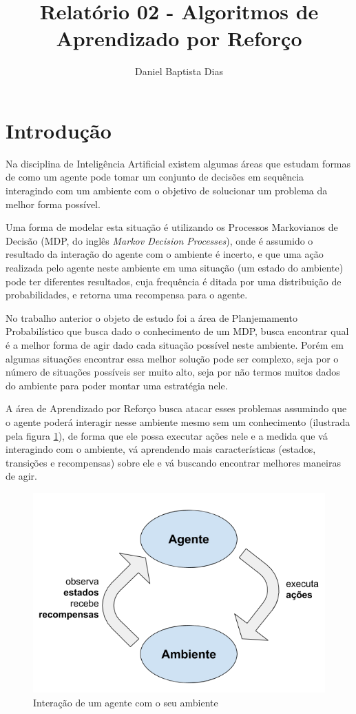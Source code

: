 \documentclass[letterpaper]{article}
\title{Relatório 02 - Algoritmos de Aprendizado por Reforço}
\author{Daniel Baptista Dias}
\begin{document}
\maketitle

\section{Introdução}
\label{sec:introducao}

Na disciplina de Inteligência Artificial existem algumas áreas que estudam formas de como um agente pode tomar um conjunto 
de decisões em sequência interagindo com um ambiente com o objetivo de solucionar um problema da melhor forma possível.

Uma forma de modelar esta situação é utilizando os Processos Markovianos de Decisão (MDP, do inglês \textit{Markov Decision Processes})\cite{Puterman-1994}, onde é assumido o resultado da interação do agente com o ambiente é incerto, e que uma ação realizada pelo agente neste ambiente em uma situação (um estado do ambiente) pode ter diferentes resultados, cuja frequência é ditada por uma distribuição de probabilidades, e retorna uma recompensa para o agente.

No trabalho anterior o objeto de estudo foi a área de Planjemamento Probabilístico que busca dado o conhecimento de um MDP, busca encontrar qual é a melhor forma de agir dado cada situação possível neste ambiente. Porém em algumas situações encontrar essa melhor solução pode ser complexo, seja por o número de situações possíveis ser muito alto, seja por não termos muitos dados do ambiente para poder montar uma estratégia nele.

A área de Aprendizado por Reforço busca atacar esses problemas assumindo que o agente poderá interagir nesse ambiente mesmo sem um conhecimento (ilustrada pela figura \ref{fig:rf-agent-interaction}), de forma que ele possa executar ações nele e a medida que vá interagindo com o ambiente, vá aprendendo mais características (estados, transições e recompensas) sobre ele e vá buscando encontrar melhores maneiras de agir.

\begin{figure}[t]
  \centering
  \includegraphics[width=0.9\columnwidth]{rf-agent-interaction}
  \caption{Interação de um agente com o seu ambiente}
  \label{fig:rf-agent-interaction}
\end{figure}
\end{document}
